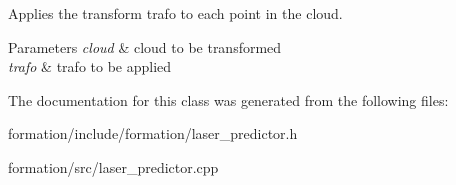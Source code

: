 Applies the transform trafo to each point in the cloud. 


\begin{DoxyParams}{Parameters}
{\em cloud} & cloud to be transformed \\
\hline
{\em trafo} & trafo to be applied \\
\hline
\end{DoxyParams}


The documentation for this class was generated from the following files\+:\begin{DoxyCompactItemize}
\item 
formation/include/formation/laser\+\_\+predictor.\+h\item 
formation/src/laser\+\_\+predictor.\+cpp\end{DoxyCompactItemize}
